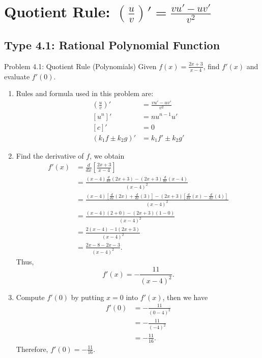 \documentclass[11pt,a4paper]{article}
\begin{document}
\newpage
\section{Quotient Rule: $\left(\frac{u}{v}\right)' = \frac{vu' - uv'}{v^2}$}

\subsection{Type 4.1: Rational Polynomial Function}
\begin{problembox}{Problem 4.1: Quotient Rule (Polynomials)}
Given $f(x) = \frac{2x + 3}{x - 4}$, find $f'(x)$ and evaluate $f'(0)$.
\end{problembox}
\begin{solutionbox}
\begin{enumerate}
	\item [Step 1.] Rules and formula used in this problem are:
	\begin{align*}
		\left(\frac{u}{v}\right)' &= \frac{v u' - u v'}{v^2} \\
		[u^n]' &= n u^{n-1} u' \\
		[c]' &= 0 \\
		(k_1f \pm k_2 g)' &= k_1f' \pm k_2g'
	\end{align*}
	
	\item [Step 2.] Find the derivative of $f$, we obtain
	\begin{align*}
		f'(x) &= \frac{d}{dx} \left[ \frac{2x + 3}{x - 4} \right] \\
		&= \frac{(x - 4) \frac{d}{dx}(2x + 3) - (2x + 3) \frac{d}{dx}(x - 4)}{(x - 4)^2} \\
		&= \frac{(x - 4) \left[ \frac{d}{dx}(2x) + \frac{d}{dx}(3) \right] - (2x + 3) \left[ \frac{d}{dx}(x) - \frac{d}{dx}(4) \right]}{(x - 4)^2} \\
		&= \frac{(x - 4)(2 + 0) - (2x + 3)(1 - 0)}{(x - 4)^2} \\
		&= \frac{2(x - 4) - 1(2x + 3)}{(x - 4)^2} \\
		&= \frac{2x - 8 - 2x - 3}{(x - 4)^2}.
	\end{align*}
	Thus,
	\begin{equation*}
		f'(x) = -\frac{11}{(x - 4)^2}.
	\end{equation*}
	
	\item [Step 3.] Compute $f'(0)$ by putting $x = 0$ into $f'(x)$, then we have
	\begin{align*}
		f'(0) &= -\frac{11}{(0 - 4)^2} \\
		&= -\frac{11}{(-4)^2} \\
		&= -\frac{11}{16}.
	\end{align*}
	Therefore, $f'(0) = -\frac{11}{16}$.
\end{enumerate}
\end{solutionbox}
\end{document}

